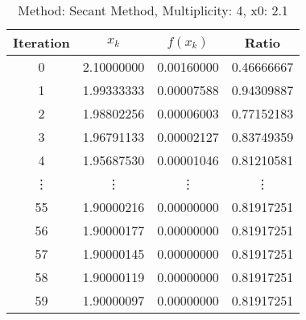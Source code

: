 \begin{table}
\centering
\caption{Method: Secant Method, Multiplicity: 4, x0: 2.1}
\label{tab:table_Secant_Method_4_2_1}
\begin{tabular}{c c c c}
\toprule
Iteration &      $x_k$ &   $f(x_k)$ &      Ratio \\
\midrule
        0 & 2.10000000 & 0.00160000 & 0.46666667 \\
        1 & 1.99333333 & 0.00007588 & 0.94309887 \\
        2 & 1.98802256 & 0.00006003 & 0.77152183 \\
        3 & 1.96791133 & 0.00002127 & 0.83749359 \\
        4 & 1.95687530 & 0.00001046 & 0.81210581 \\
   \vdots &     \vdots &     \vdots &     \vdots \\
       55 & 1.90000216 & 0.00000000 & 0.81917251 \\
       56 & 1.90000177 & 0.00000000 & 0.81917251 \\
       57 & 1.90000145 & 0.00000000 & 0.81917251 \\
       58 & 1.90000119 & 0.00000000 & 0.81917251 \\
       59 & 1.90000097 & 0.00000000 & 0.81917251 \\
\bottomrule
\end{tabular}
\end{table}
